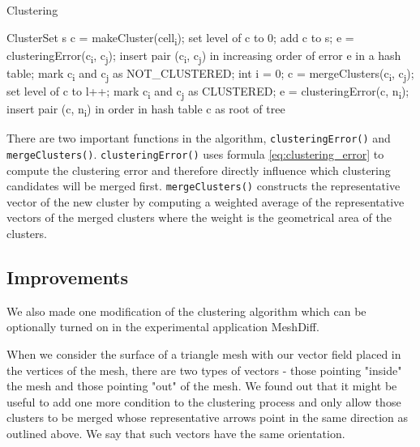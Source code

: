\begin{algorithm}[H]
\caption{Clustering}
\begin{algorithmic}[1]

\Require ClusterSet s
\Statex
{}
	\State c = makeCluster(cell\textsubscript{i});
    \State set level of c to 0;
    \State add c to s;
\EndFor
\Statex
{}
    	\State e = clusteringError(c\textsubscript{i}, c\textsubscript{j});
        \State insert pair (c\textsubscript{i}, c\textsubscript{j}) in increasing order of error e in a hash table;
        \State mark c\textsubscript{i} and c\textsubscript{j} as NOT\_CLUSTERED;
    \EndFor
\EndFor
\Statex
\State int i = 0;
    	\State c = mergeClusters(c\textsubscript{i}, c\textsubscript{j});
        set level of c to l++;
        mark c\textsubscript{i} and c\textsubscript{j} as CLUSTERED;
        	\State e = clusteringError(c, n\textsubscript{i});
            insert pair (c, n\textsubscript{i}) in order in hash table
        \EndFor
    \EndIf
\EndFor
\Statex
\Return c as root of tree
\end{algorithmic}
\end{algorithm}

There are two important functions in the algorithm, \texttt{clusteringError()} and \texttt{mergeClusters()}. \texttt{clusteringError()} uses formula \ref{eq:clustering_error} to compute the clustering error and therefore directly influence which clustering candidates will be merged first. \texttt{mergeClusters()} constructs the representative vector of the new cluster by computing a weighted average of the representative vectors of the merged clusters where the weight is the geometrical area of the clusters.
\subsection{Improvements}

We also made one modification of the clustering algorithm which can be optionally turned on in the experimental application MeshDiff.

When we consider the surface of a triangle mesh with our vector field placed in the vertices of the mesh, there are two types of vectors - those pointing "inside" the mesh and those pointing "out" of the mesh. We found out that it might be useful to add one more condition to the clustering process and only allow those clusters to be merged whose representative arrows point in the same direction as outlined above. We say that such vectors have the same orientation.

